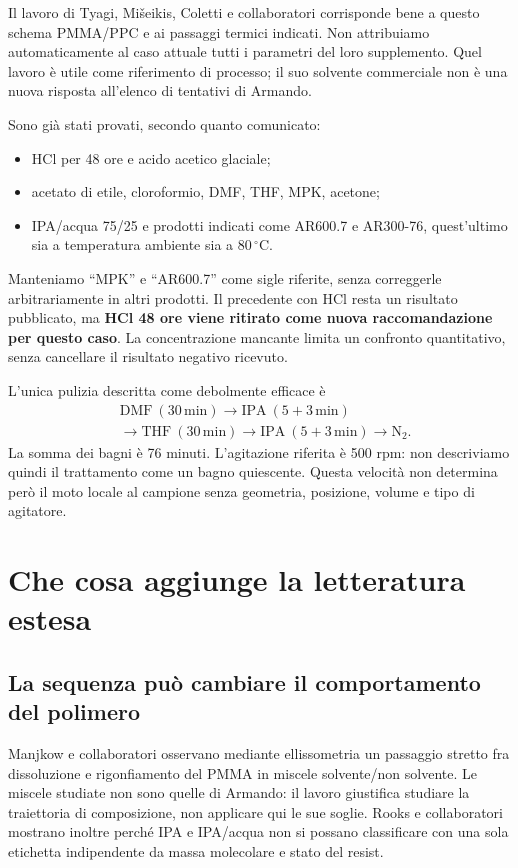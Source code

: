 \documentclass[11pt,reqno]{amsart}
\numberwithin{equation}{section}
\newcommand{\degC}{\ensuremath{^{\circ}\mathrm{C}}}
\begin{document}
Il lavoro di Tyagi, Mi\v{s}eikis, Coletti e collaboratori
\cite{Tyagi2022} corrisponde bene a questo schema PMMA/PPC e ai
passaggi termici indicati. Non attribuiamo automaticamente al caso
attuale tutti i parametri del loro supplemento. Quel lavoro \`e
utile come riferimento di processo; il suo solvente commerciale
non \`e una nuova risposta all'elenco di tentativi di Armando.

Sono gi\`a stati provati, secondo quanto comunicato:
\begin{itemize}
\item HCl per 48 ore e acido acetico glaciale;
\item acetato di etile, cloroformio, DMF, THF, MPK, acetone;
\item IPA/acqua 75/25 e prodotti indicati come AR600.7 e AR300-76,
quest'ultimo sia a temperatura ambiente sia a 80\,\degC.
\end{itemize}
Manteniamo ``MPK'' e ``AR600.7'' come sigle riferite, senza
correggerle arbitrariamente in altri prodotti. Il precedente con
HCl \cite{Xiao2019} resta un risultato pubblicato, ma \textbf{HCl
48 ore viene ritirato come nuova raccomandazione per questo caso}.
La concentrazione mancante limita un confronto quantitativo, senza
cancellare il risultato negativo ricevuto.

L'unica pulizia descritta come debolmente efficace \`e
\begin{equation}\label{eq:real}
\begin{split}
 &\mathrm{DMF}\ (30\,\mathrm{min})
 \longrightarrow \mathrm{IPA}\ (5+3\,\mathrm{min})\\[-2pt]
 &\longrightarrow \mathrm{THF}\ (30\,\mathrm{min})
 \longrightarrow \mathrm{IPA}\ (5+3\,\mathrm{min})
 \longrightarrow \mathrm{N_2}.
\end{split}
\end{equation}
La somma dei bagni \`e 76 minuti. L'agitazione riferita \`e 500 rpm:
non descriviamo quindi il trattamento come un bagno quiescente.
Questa velocit\`a non determina per\`o il moto locale al campione
senza geometria, posizione, volume e tipo di agitatore.

\section{Che cosa aggiunge la letteratura estesa}

\subsection{La sequenza pu\`o cambiare il comportamento del polimero}
Manjkow e collaboratori \cite{Manjkow1987} osservano mediante
ellissometria un passaggio stretto fra dissoluzione e rigonfiamento
del PMMA in miscele solvente/non solvente. Le miscele studiate non
sono quelle di Armando: il lavoro giustifica studiare la traiettoria
di composizione, non applicare qui le sue soglie. Rooks e
collaboratori \cite{Rooks2002} mostrano inoltre perch\'e IPA e
IPA/acqua non si possano classificare con una sola etichetta
indipendente da massa molecolare e stato del resist.
\end{document}
